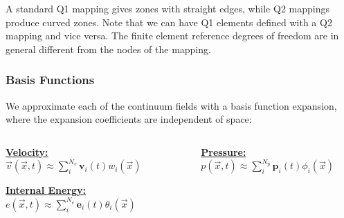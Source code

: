 \documentclass[8pt,xcolor=svgnames]{beamer}
\begin{document}
\begin{frame}[shrink=5]
\begin{columns}
\begin{column}{0.3\textwidth}
\begin{figure}[h!]
    \end{figure}
    \centering
     
  \end{column}
 \end{columns}
\centering
\begin{block}{}
A standard Q1 mapping gives zones with straight edges, while Q2 mappings produce curved zones.
Note that we can have Q1 elements defined with a Q2 mapping and vice versa. The finite element
reference degrees of freedom are in general different from the nodes of the mapping.
\end{block}
\end{frame}

\begin{frame}
 \frametitle{Basis Functions}
 We approximate each of the continuum fields with a basis function expansion, where the expansion
coefficients are independent of space:
\smallskip

\begin{columns}
 \begin{column}{0.5\textwidth}
 \centering
  \textbf{\underline{Velocity:}} $\vec{v}(\vec{x},t)\approx \displaystyle\sum_i^{N_v} \mathbf{v}_i(t) w_i(\vec{x})$
  
  \textbf{\underline{Internal Energy:}} $e(\vec{x},t)\approx \displaystyle\sum_i^{N_e} \mathbf{e}_i(t) \theta_i(\vec{x})$
 \end{column}
 \begin{column}{0.5\textwidth}
 \centering
  \textbf{\underline{Pressure:}} $p(\vec{x},t)\approx \displaystyle\sum_i^{N_p} \mathbf{p}_i(t) \phi_i(\vec{x})$
  

\end{column}
\end{columns}
\end{frame}
\end{document}
